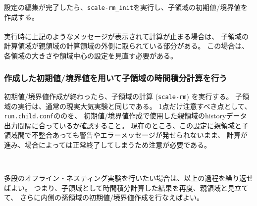 設定の編集が完了したら、\verb|scale-rm_init|を実行し、子領域の初期値/境界値を作成する。\\

\\

\noindent 実行時に上記のようなメッセージが表示されて計算が止まる場合は、
子領域の計算領域が親領域の計算領域の外側に取られている部分がある。
この場合は、各領域の大きさや領域中心の設定を見直す必要がある。


\subsubsection{作成した初期値/境界値を用いて子領域の時間積分計算を行う}
初期値/境界値作成が終わったら、子領域の計算 (\verb|scale-rm|) を実行する。
子領域の実行は、通常の現実大気実験と同じである。
1点だけ注意すべき点として、
\verb|run.child.conf|ののを、
初期値/境界値作成で使用した親領域のhistoryデータ出力間隔に合っているか確認すること。
現在のところ、この設定に親領域と子領域間で不整合あっても警告やエラーメッセージが発せられないまま、
計算が進み、場合によっては正常終了してしまうため注意が必要である。


\\

\noindent 

多段のオフライン・ネスティング実験を行いたい場合は、以上の過程を繰り返せばよい。
つまり、子領域として時間積分計算した結果を再度、親領域と見立てて、
さらに内側の孫領域の初期値/境界値作成を行なえばよい。



\subsection{\SubsecOnlineNesting} \label{subsec:nest_online}

